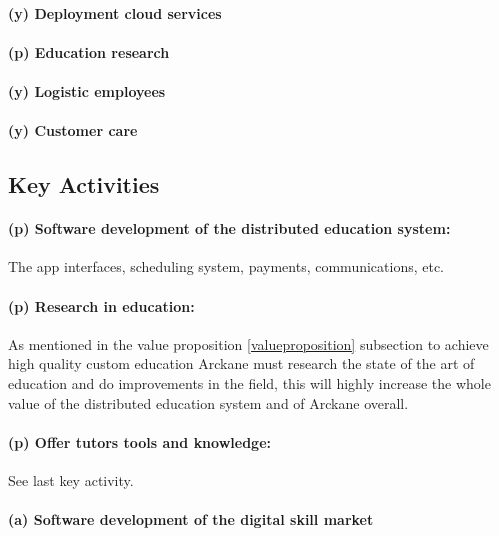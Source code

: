 \paragraph{(y) Deployment cloud services}

\paragraph{(p) Education research}

\paragraph{(y) Logistic employees}

\paragraph{(y) Customer care}


\subsection{Key Activities}\label{keyactivities}

\paragraph{(p) Software development of the distributed education system:} The app interfaces, scheduling system, payments, communications, etc.

\paragraph{(p) Research in education:} As mentioned in the value proposition \ref{valueproposition} subsection to achieve high quality custom education Arckane must research the state of the art of education and do improvements in the field, this will highly increase the whole value of the distributed education system and of Arckane overall.

\paragraph{(p) Offer tutors tools and knowledge:} See last key activity.

\paragraph{(a) Software development of the digital skill market}


